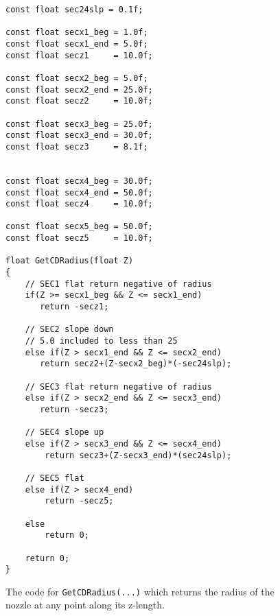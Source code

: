 
\begin{figure}[h]
\centering
\lstset{style=gpucode,linewidth=6.5in,xleftmargin=0.25in}

\begin{lstlisting}
const float sec24slp = 0.1f;

const float secx1_beg = 1.0f;
const float secx1_end = 5.0f;
const float secz1     = 10.0f;

const float secx2_beg = 5.0f;
const float secx2_end = 25.0f;
const float secz2     = 10.0f;

const float secx3_beg = 25.0f;
const float secx3_end = 30.0f;
const float secz3     = 8.1f;


const float secx4_beg = 30.0f;
const float secx4_end = 50.0f;
const float secz4     = 10.0f;

const float secx5_beg = 50.0f;
const float secz5     = 10.0f;

float GetCDRadius(float Z)
{
	// SEC1 flat return negative of radius
	if(Z >= secx1_beg && Z <= secx1_end)
       return -secz1;
	   
	// SEC2 slope down
	// 5.0 included to less than 25
	else if(Z > secx1_end && Z <= secx2_end)
	   return secz2+(Z-secx2_beg)*(-sec24slp);

	// SEC3 flat return negative of radius
	else if(Z > secx2_end && Z <= secx3_end)
       return -secz3;
	   
	// SEC4 slope up
	else if(Z > secx3_end && Z <= secx4_end)
		return secz3+(Z-secx3_end)*(sec24slp);
		
	// SEC5 flat
	else if(Z > secx4_end)
        return -secz5;  
		
	else
		return 0;

	return 0;
}
\end{lstlisting}


\caption[Benchset test configuration file]{The code for \texttt{GetCDRadius(...)} which returns the radius of the nozzle at any point along its z-length.}
\label{fig:GetCDRadius}
\end{figure}
